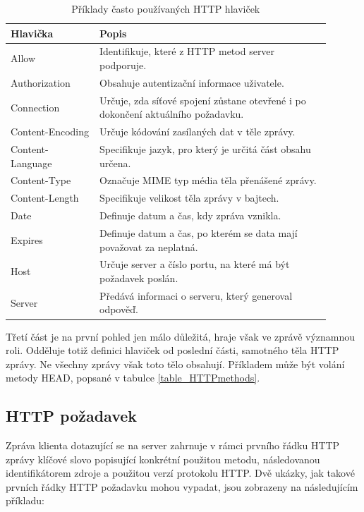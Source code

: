 \begin{table}[h]
\centering
\begin{tabular}{ |p{0.25\linewidth} | p{0.65\linewidth}| }
 \hline
Hlavička & Popis \\ 
 \hline
Allow  & Identifikuje, které z HTTP metod server podporuje. \\
\hline
Authorization & Obsahuje autentizační informace uživatele.  \\
 \hline
Connection & Určuje, zda síťové spojení zůstane otevřené i po dokončení aktuálního požadavku. \\
 \hline
Content-Encoding & Určuje kódování zasílaných dat v těle zprávy. \\
 \hline
Content-Language & Specifikuje jazyk, pro který je určitá část obsahu určena. \\
 \hline
Content-Type & Označuje MIME typ média těla přenášené zprávy.  \\ 
 \hline
Content-Length & Specifikuje velikost těla zprávy v bajtech. \\
 \hline
Date & Definuje datum a čas, kdy zpráva vznikla. \\
 \hline
Expires & Definuje datum a čas, po kterém se data mají považovat za neplatná. \\
 \hline
Host & Určuje server a číslo portu, na které má být požadavek poslán. \\
 \hline
Server & Předává informaci o serveru, který generoval odpověď. \\
 \hline
\end{tabular}
\caption{Příklady často používaných HTTP hlaviček}
\label{table_UkazkaHlavice}
\end{table}


Třetí část je na první pohled jen málo důležitá, hraje však ve zprávě významnou roli. Odděluje totiž definici hlaviček od poslední části, samotného těla HTTP zprávy. Ne všechny zprávy však toto tělo obsahují. Příkladem může být volání metody HEAD, popsané v tabulce \ref{table_HTTPmethods}.


\subsection*{HTTP požadavek}
Zpráva klienta dotazující se na server zahrnuje v rámci prvního řádku HTTP zprávy klíčové slovo popisující konkrétní použitou metodu, následovanou identifikátorem zdroje a použitou verzí protokolu HTTP. Dvě ukázky, jak takové prvních řádky HTTP požadavku mohou vypadat, jsou zobrazeny na následujícím příkladu: 

